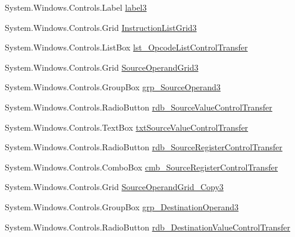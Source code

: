 \begin{DoxyCompactItemize}
\item 
System.\+Windows.\+Controls.\+Label \hyperlink{class_c_p_u___o_s___simulator_1_1_instructions_window_a394b28c312ae1a83128da41990fc5d32}{label3}
\item 
System.\+Windows.\+Controls.\+Grid \hyperlink{class_c_p_u___o_s___simulator_1_1_instructions_window_a3cc76cf3ae5c4155d0e30727eb357d12}{Instruction\+List\+Grid3}
\item 
System.\+Windows.\+Controls.\+List\+Box \hyperlink{class_c_p_u___o_s___simulator_1_1_instructions_window_a111f1ddd903fe40e0c83efeca42bdf51}{lst\+\_\+\+Opcode\+List\+Control\+Transfer}
\item 
System.\+Windows.\+Controls.\+Grid \hyperlink{class_c_p_u___o_s___simulator_1_1_instructions_window_ab8409532df6419d7f7ce0c3450807906}{Source\+Operand\+Grid3}
\item 
System.\+Windows.\+Controls.\+Group\+Box \hyperlink{class_c_p_u___o_s___simulator_1_1_instructions_window_a59e5e9da77976ce8f2d8a43528b98f63}{grp\+\_\+\+Source\+Operand3}
\item 
System.\+Windows.\+Controls.\+Radio\+Button \hyperlink{class_c_p_u___o_s___simulator_1_1_instructions_window_a590a2e5af41ea5cf215da3ff7dd1b20b}{rdb\+\_\+\+Source\+Value\+Control\+Transfer}
\item 
System.\+Windows.\+Controls.\+Text\+Box \hyperlink{class_c_p_u___o_s___simulator_1_1_instructions_window_a602831ff353007879c08b22d373a2ba5}{txt\+Source\+Value\+Control\+Transfer}
\item 
System.\+Windows.\+Controls.\+Radio\+Button \hyperlink{class_c_p_u___o_s___simulator_1_1_instructions_window_a63fea6d97a26f4ed71753209dac85d24}{rdb\+\_\+\+Source\+Register\+Control\+Transfer}
\item 
System.\+Windows.\+Controls.\+Combo\+Box \hyperlink{class_c_p_u___o_s___simulator_1_1_instructions_window_a652354e464657693cf70a292b3389626}{cmb\+\_\+\+Source\+Register\+Control\+Transfer}
\item 
System.\+Windows.\+Controls.\+Grid \hyperlink{class_c_p_u___o_s___simulator_1_1_instructions_window_ac37123264ae139f4abc30841da21cd23}{Source\+Operand\+Grid\+\_\+\+Copy3}
\item 
System.\+Windows.\+Controls.\+Group\+Box \hyperlink{class_c_p_u___o_s___simulator_1_1_instructions_window_a175eb53a0a0f48be4d8717f1e5a5942e}{grp\+\_\+\+Destination\+Operand3}
\item 
System.\+Windows.\+Controls.\+Radio\+Button \hyperlink{class_c_p_u___o_s___simulator_1_1_instructions_window_afedaca6e4102fbae9f5db622be1b839d}{rdb\+\_\+\+Destination\+Value\+Control\+Transfer}

\end{DoxyCompactItemize}
